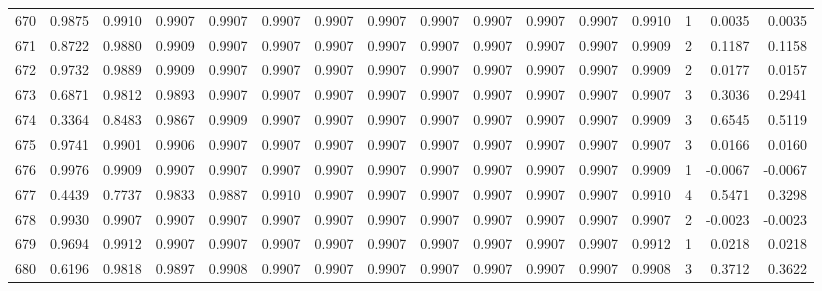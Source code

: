 \begin{tabular}{lrrrrrrrrrrrrrrr}
670 &      0.9875 &  0.9910 &  0.9907 &  0.9907 &  0.9907 &  0.9907 &  0.9907 &  0.9907 &  0.9907 &  0.9907 &   0.9907 &     0.9910 &      1 &                    0.0035 &                     0.0035 \\
671 &      0.8722 &  0.9880 &  0.9909 &  0.9907 &  0.9907 &  0.9907 &  0.9907 &  0.9907 &  0.9907 &  0.9907 &   0.9907 &     0.9909 &      2 &                    0.1187 &                     0.1158 \\
672 &      0.9732 &  0.9889 &  0.9909 &  0.9907 &  0.9907 &  0.9907 &  0.9907 &  0.9907 &  0.9907 &  0.9907 &   0.9907 &     0.9909 &      2 &                    0.0177 &                     0.0157 \\
673 &      0.6871 &  0.9812 &  0.9893 &  0.9907 &  0.9907 &  0.9907 &  0.9907 &  0.9907 &  0.9907 &  0.9907 &   0.9907 &     0.9907 &      3 &                    0.3036 &                     0.2941 \\
674 &      0.3364 &  0.8483 &  0.9867 &  0.9909 &  0.9907 &  0.9907 &  0.9907 &  0.9907 &  0.9907 &  0.9907 &   0.9907 &     0.9909 &      3 &                    0.6545 &                     0.5119 \\
675 &      0.9741 &  0.9901 &  0.9906 &  0.9907 &  0.9907 &  0.9907 &  0.9907 &  0.9907 &  0.9907 &  0.9907 &   0.9907 &     0.9907 &      3 &                    0.0166 &                     0.0160 \\
676 &      0.9976 &  0.9909 &  0.9907 &  0.9907 &  0.9907 &  0.9907 &  0.9907 &  0.9907 &  0.9907 &  0.9907 &   0.9907 &     0.9909 &      1 &                   -0.0067 &                    -0.0067 \\
677 &      0.4439 &  0.7737 &  0.9833 &  0.9887 &  0.9910 &  0.9907 &  0.9907 &  0.9907 &  0.9907 &  0.9907 &   0.9907 &     0.9910 &      4 &                    0.5471 &                     0.3298 \\
678 &      0.9930 &  0.9907 &  0.9907 &  0.9907 &  0.9907 &  0.9907 &  0.9907 &  0.9907 &  0.9907 &  0.9907 &   0.9907 &     0.9907 &      2 &                   -0.0023 &                    -0.0023 \\
679 &      0.9694 &  0.9912 &  0.9907 &  0.9907 &  0.9907 &  0.9907 &  0.9907 &  0.9907 &  0.9907 &  0.9907 &   0.9907 &     0.9912 &      1 &                    0.0218 &                     0.0218 \\
680 &      0.6196 &  0.9818 &  0.9897 &  0.9908 &  0.9907 &  0.9907 &  0.9907 &  0.9907 &  0.9907 &  0.9907 &   0.9907 &     0.9908 &      3 &                    0.3712 &                     0.3622 \\

\end{tabular}
